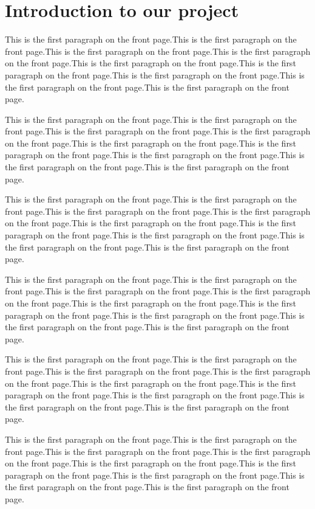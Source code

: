 \documentclass{article}
\begin{document}
\newpage
\section{Introduction to our project}
This is the first paragraph on the front page.This is the first paragraph on the front page.This is the first paragraph on the front page.This is the first paragraph on the front page.This is the first paragraph on the front page.This is the first paragraph on the front page.This is the first paragraph on the front page.This is the first paragraph on the front page.This is the first paragraph on the front page.\par
This is the first paragraph on the front page.This is the first paragraph on the front page.This is the first paragraph on the front page.This is the first paragraph on the front page.This is the first paragraph on the front page.This is the first paragraph on the front page.This is the first paragraph on the front page.This is the first paragraph on the front page.This is the first paragraph on the front page.\par
This is the first paragraph on the front page.This is the first paragraph on the front page.This is the first paragraph on the front page.This is the first paragraph on the front page.This is the first paragraph on the front page.This is the first paragraph on the front page.This is the first paragraph on the front page.This is the first paragraph on the front page.This is the first paragraph on the front page.\par
This is the first paragraph on the front page.This is the first paragraph on the front page.This is the first paragraph on the front page.This is the first paragraph on the front page.This is the first paragraph on the front page.This is the first paragraph on the front page.This is the first paragraph on the front page.This is the first paragraph on the front page.This is the first paragraph on the front page.\par
This is the first paragraph on the front page.This is the first paragraph on the front page.This is the first paragraph on the front page.This is the first paragraph on the front page.This is the first paragraph on the front page.This is the first paragraph on the front page.This is the first paragraph on the front page.This is the first paragraph on the front page.This is the first paragraph on the front page.\par
This is the first paragraph on the front page.This is the first paragraph on the front page.This is the first paragraph on the front page.This is the first paragraph on the front page.This is the first paragraph on the front page.This is the first paragraph on the front page.This is the first paragraph on the front page.This is the first paragraph on the front page.This is the first paragraph on the front page.\par
\end{document}
